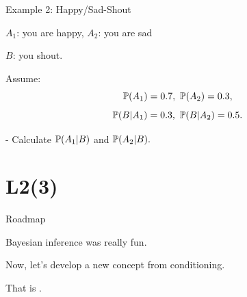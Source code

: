 \begin{frame}{Example 2: Happy/Sad-Shout}

{
\plitemsep 0.1in
\bci 

\item $A_1$: you are happy, $A_2$: you are sad
\item $B$: you shout. 

\item Assume: 
$$
\cprob{A_1}=0.7, \ \cprob{A_2}=0.3,
$$
$$
\mathbb{P}( B | A_1 ) = 0.3, \ \mathbb{P}( B | A_2 )=0.5.
$$

\eci 
}
{
\medskip

- Calculate $\mathbb{P}( A_1 | B )$ and $\mathbb{P}( A_2 | B ).$


}

 

\end{frame}


\section{L2(3)}
\begin{frame}{Roadmap}

\bce[(1)]
\item {}

\item {}

\item {}

\ece
\end{frame}



\begin{frame}{}
\vspace{2cm}
\LARGE Bayesian inference was really fun. 

\medskip

Now, let's develop a new concept from conditioning. 

\medskip

\LARGE That is . 

\end{frame}

